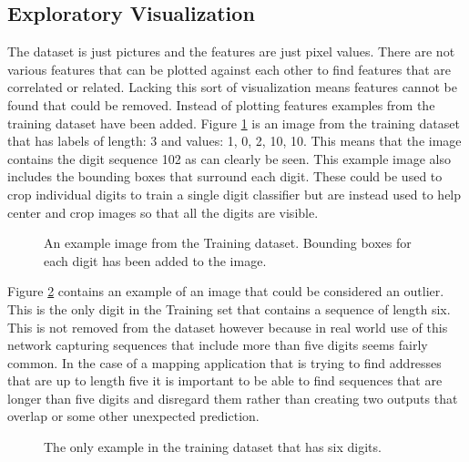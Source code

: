 \documentclass[12pt,twocolumn,letterpaper]{article}
\begin{document}
\subsection{Exploratory Visualization}
The dataset is just pictures and the features are just pixel values. There are 
not various features that can be plotted against each other to find features that 
are correlated or related. Lacking this sort of visualization means features cannot 
be found that could be removed. Instead of plotting features examples from the 
training dataset have been added. Figure \ref{fig:Original Figure} is an image from the training dataset that has labels 
of length: 3 and values: 1, 0, 2, 10, 10. This means that the image contains the 
digit sequence 102 as can clearly be seen. This example image also includes the
bounding boxes that surround each digit. These could be used to crop individual 
digits to train a single digit classifier but are instead used to help center and 
crop images so that all the digits are visible.

\begin{figure}[t]
\begin{center}
\end{center}
   \caption{An example image from the Training dataset. Bounding boxes for each
   			digit has been added to the image.}
\label{fig:Original Figure}
\end{figure}

Figure \ref{fig:6 Digit Figure} contains an example of an image that could be considered an outlier. 
This is the only digit in the Training set that contains a sequence of length 
six. This is not removed from the dataset however because in real world use of 
this network capturing sequences that include more than five digits seems fairly 
common. In the case of a mapping application that is trying to find addresses 
that are up to length five it is important to be able to find sequences that are 
longer than five digits and disregard them rather than creating two outputs that 
overlap or some other unexpected prediction.

\begin{figure}[t]
\begin{center}
\end{center}
   \caption{The only example in the training dataset that has six digits.}
\label{fig:6 Digit Figure}
\end{figure}
\end{document}
